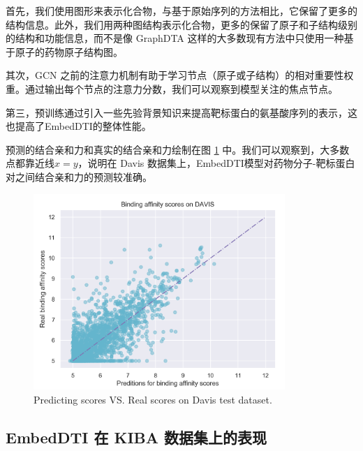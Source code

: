 首先，我们使用图形来表示化合物，与基于原始序列的方法相比，它保留了更多的结构信息。此外，我们用两种图结构表示化合物，更多的保留了原子和子结构级别的结构和功能信息，而不是像 GraphDTA 这样的大多数现有方法中只使用一种基于原子的药物原子结构图。

其次，GCN 之前的注意力机制有助于学习节点（原子或子结构）的相对重要性权重。通过输出每个节点的注意力分数，我们可以观察到模型关注的焦点节点。

第三，预训练通过引入一些先验背景知识来提高靶标蛋白的氨基酸序列的表示，这也提高了EmbedDTI的整体性能。


预测的结合亲和力和真实的结合亲和力绘制在图 \ref{fig:davis-affinity} 中。我们可以观察到，大多数点都靠近线$x=y$，说明在 Davis 数据集上，EmbedDTI模型对药物分子-靶标蛋白对之间结合亲和力的预测较准确。

\begin{figure}[!htbp] 
\centering
\includegraphics[width=0.85\textwidth]  {imgs/davis-affinity.png}
{Predicting scores VS. Real scores on Davis test dataset.}
\label{fig:davis-affinity}
\end{figure}

\subsection{EmbedDTI 在 KIBA 数据集上的表现}

